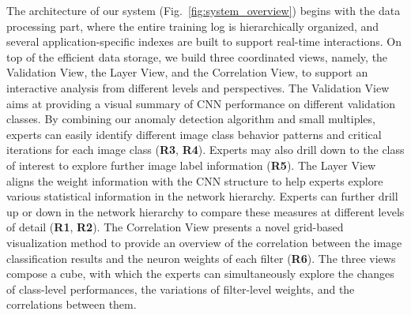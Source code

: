 \documentclass[format=acmsmall, review=false, screen=true]{acmart}
\newcommand{\ti}{\textcolor[rgb]{0,0,0}}
\newcommand{\dy}{\textcolor[rgb]{0,0,0}}
\begin{document}
The architecture of our system (Fig.~\ref{fig:system_overview}) begins with the data processing part, where the entire training log is hierarchically organized, and several application-specific indexes are built to support real-time interactions.
On top of the efficient data storage, we build three coordinated views, namely, the Validation View, the Layer View, and the Correlation View, to support an interactive analysis from different levels and perspectives.
The Validation View aims at providing a visual summary of CNN performance on different validation classes.
By combining our anomaly detection algorithm and small multiples, experts can easily identify different image class behavior patterns and critical iterations for each image class (\textbf{R3}, \textbf{R4}).
Experts may also drill down to the class of interest to explore further image label information (\textbf{R5}).
The Layer View aligns the weight information with the CNN structure to help experts explore various statistical information in the network hierarchy.
Experts can further drill up or down in the network hierarchy to compare these measures at different levels of detail (\textbf{R1}, \textbf{R2}).
The Correlation View presents a novel grid-based visualization method to provide an overview of the correlation between the image classification results and the neuron weights of each filter (\textbf{R6}).
\ti{
The three views compose a cube, with which the experts can simultaneously explore the changes of class-level performances, the variations of filter-level weights, and the correlations between them.
}%
\end{document}
